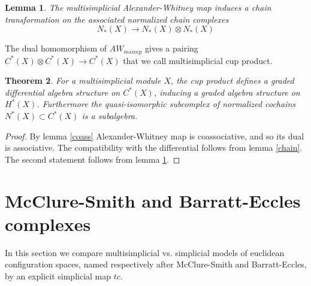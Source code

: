 \documentclass[a4paper,11pt]{article}
\newtheorem{theorem}{Theorem}[section]
\newtheorem{lemma}[theorem]{Lemma}
\theoremstyle{remark}
\theoremstyle{definition}
\begin{document}


\begin{lemma}
	\label{normalizedMAW}
The multisimplicial Alexander-Whitney map induces a chain transformation on the associated normalized chain complexes
	\begin{equation*}
	N_*(X) \rightarrow N_*(X)\otimes N_*(X)
	\end{equation*} 
\end{lemma}
The dual homomorphism of $AW_{msimp}$ gives a pairing $C^*(X) \otimes C^*(X) \to C^*(X)$ that we call multisimplicial cup product.
\begin{theorem}  \label{algebra}
For a multisimplicial module $X$, the cup product defines  a graded differential algebra 
structure on $C^*(X)$, inducing a graded algebra structure on $H^*(X)$.
Furthermore the quasi-isomorphic subcomplex of normalized cochains 
$N^*(X) \subset C^*(X)$ is a subalgebra. 
\end{theorem}
\begin{proof}
By lemma \ref{coass} Alexander-Whitney map is coassociative, and so its dual is associative.
The compatibility with the differential follows from lemma \ref{chain}.
The second statement follows from lemma \ref{normalizedMAW}.
\end{proof}




\section{McClure-Smith and Barratt-Eccles  complexes } 

In this section we compare  multisimplicial vs. simplicial  models of euclidean configuration spaces,
 named respectively after McClure-Smith and Barratt-Eccles, by an explicit simplicial map $tc$.
\end{document}
